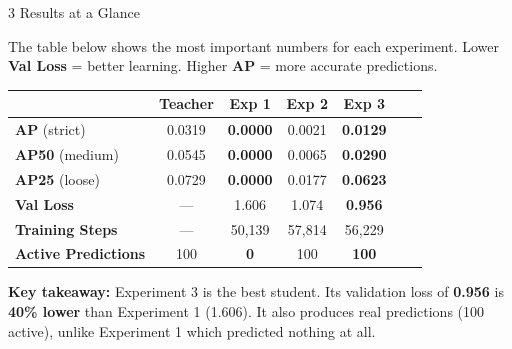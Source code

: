 \documentclass[12pt,a4paper]{article}
\newcommand{\metric}[1]{\textbf{\textcolor{mainblue}{\large #1}}}
\newcommand{\good}[1]{\textbf{\textcolor{accentgreen}{#1}}}
\newcommand{\bad}[1]{\textbf{\textcolor{alertred}{#1}}}
\begin{document}
\begin{sectionbox}[mainblue]{3 \quad Results at a Glance}

The table below shows the most important numbers for each experiment.
Lower \textbf{Val Loss} = better learning.
Higher \textbf{AP} = more accurate predictions.

\vspace{8pt}
\begin{center}
\renewcommand{\arraystretch}{1.6}
\begin{tabular}{lcccccc}
\toprule
 & \textbf{Teacher} & \textbf{Exp 1} & \textbf{Exp 2} & \textbf{Exp 3} \\
\midrule
\textbf{AP} (strict)
  & 0.0319 & \bad{0.0000} & 0.0021 & \good{0.0129} \\
\textbf{AP50} (medium)
  & 0.0545 & \bad{0.0000} & 0.0065 & \good{0.0290} \\
\textbf{AP25} (loose)
  & 0.0729 & \bad{0.0000} & 0.0177 & \good{0.0623} \\
\textbf{Val Loss}
  & — & 1.606 & 1.074 & \good{0.956} \\
\textbf{Training Steps}
  & — & 50{,}139 & 57{,}814 & 56{,}229 \\
\textbf{Active Predictions}
  & 100 & \bad{0} & 100 & \good{100} \\
\bottomrule
\end{tabular}
\end{center}

\vspace{8pt}
\begin{keybox}[accentgreen]
\textbf{Key takeaway:} \quad
Experiment 3 is the best student. Its validation loss of \metric{0.956}
is \metric{40\% lower} than Experiment 1 (1.606). It also produces real predictions
(100 active), unlike Experiment 1 which predicted nothing at all.
\end{keybox}

\end{sectionbox}

\vspace{10pt}
\end{document}

